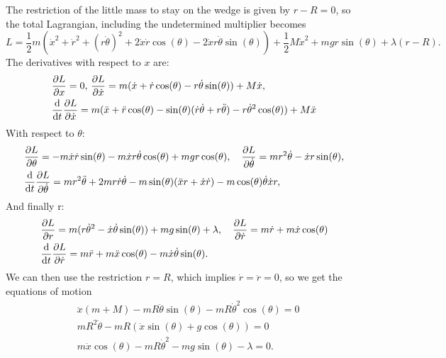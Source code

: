 \documentclass{article}
\begin{document}
        The restriction of the little mass to stay on the wedge is given by $r - R = 0$, so the total Lagrangian, including the undetermined multiplier becomes
        \begin{equation*}
            L = \frac{1}{2}m \left(\dot x^2 + \dot r^2 + (r \dot \theta)^2+ 2 \dot x \dot r \cos(\theta) - 2 \dot x r \dot \theta \sin(\theta) \right) + \frac{1}{2}M \dot x^2 + mgr\sin(\theta) + \lambda(r - R).
        \end{equation*}
        The derivatives with respect to $x$ are:
        \begin{align*}
            &\pdv{L}{x} = 0, \, \pdv{L}{\dot x} = m (\dot x +  \dot r \cos(\theta) -  r \dot \theta \sin(\theta)) + M \dot x, \\
            &\dv{t}\pdv{L}{\dot x} = m(\ddot x + \ddot r \cos(\theta) - \sin(\theta)(\dot r \dot \theta + r \ddot \theta) -  r \dot \theta^2 \cos(\theta)) + M \ddot x
        \end{align*}
        With respect to $\theta$:
        \begin{align*}
            & \pdv{L}{\theta} = - m \dot x \dot r \sin(\theta) - m \dot x r \dot \theta \cos(\theta) + m g r \cos(\theta), \quad  \pdv{L}{\dot \theta} = m r^2 \dot \theta -  \dot x r \sin(\theta), \\
            &\dv{t} \pdv{L}{\dot \theta} = m r^2 \ddot \theta + 2m r \dot r \dot \theta - m \sin(\theta)( \ddot x r + \dot x \dot r) -  m \cos(\theta) \dot \theta \dot x r,
        \end{align*}
        And finally r:
        \begin{align*}
            & \pdv{L}{r} = m(r \dot \theta^2 - \dot x \dot \theta \sin(\theta)) + m g \sin(\theta) + \lambda, \quad 
            \pdv{L}{\dot r} = m \dot r + m \dot x \cos(\theta)  \\
            & \dv{t} \pdv{L}{\dot r} = m \ddot r + m \ddot x \cos(\theta) - m \dot x \dot \theta \sin(\theta).
        \end{align*}
        We can then use the restriction $r = R$, which implies $\dot r = \ddot r = 0$, so we get the equations of motion
        \begin{align*}
            & \ddot x(m + M) - m R \ddot \theta \sin(\theta) - m R \dot \theta^2 \cos(\theta) = 0 \\
            & mR^2 \ddot \theta - mR (\ddot x \sin(\theta) + g\cos(\theta)) = 0 \\
            & m \ddot x \cos(\theta) - m R \dot \theta^2 - m g \sin(\theta) - \lambda = 0.
        \end{align*}
\end{document}
